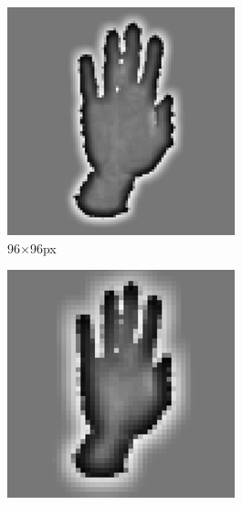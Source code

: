 \begin{figure}[ht]
\centering
        \begin{subfigure}{0.3\textwidth}
                \centering
                \includegraphics[width=\textwidth]{figures_1_hand_tracking/pyramid1}
                \caption{\footnotesize 96$\times$96px}
        \end{subfigure}
        \begin{subfigure}{0.3\textwidth}
                \centering
                \includegraphics[width=\textwidth]{figures_1_hand_tracking/pyramid2}

\end{subfigure}
\end{figure}
